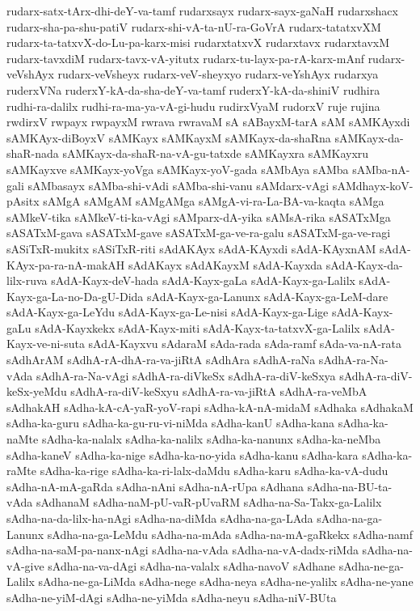 {rudarx-satx-tArx-dhi-deY-va-tamf
rudarxsayx
rudarx-sayx-gaNaH
rudarxshacx
rudarx-sha-pa-shu-patiV
rudarx-shi-vA-ta-nU-ra-GoVrA
rudarx-tatatxvXM
rudarx-ta-tatxvX-do-Lu-pa-karx-misi
rudarxtatxvX
rudarxtavx
rudarxtavxM
rudarx-tavxdiM
rudarx-tavx-vA-yitutx
rudarx-tu-layx-pa-rA-karx-mAnf
rudarx-veVshAyx
rudarx-veVsheyx
rudarx-veV-sheyxyo
rudarx-veYshAyx
rudarxya
ruderxVNa
ruderxY-kA-da-sha-deY-va-tamf
ruderxY-kA-da-shiniV
rudhira
rudhi-ra-dalilx
rudhi-ra-ma-ya-vA-gi-hudu
rudirxVyaM
rudorxV
ruje
rujina
rwdirxV
rwpayx
rwpayxM
rwrava
rwravaM
sA
sABayxM-tarA
sAM
sAMKAyxdi
sAMKAyx-diBoyxV
sAMKayx
sAMKayxM
sAMKayx-da-shaRna
sAMKayx-da-shaR-nada
sAMKayx-da-shaR-na-vA-gu-tatxde
sAMKayxra
sAMKayxru
sAMKayxve
sAMKayx-yoVga
sAMKayx-yoV-gada
sAMbAya
sAMba
sAMba-nA-gali
sAMbasayx
sAMba-shi-vAdi
sAMba-shi-vanu
sAMdarx-vAgi
sAMdhayx-koV-pAsitx
sAMgA
sAMgAM
sAMgAMga
sAMgA-vi-ra-La-BA-va-kaqta
sAMga
sAMkeV-tika
sAMkeV-ti-ka-vAgi
sAMparx-dA-yika
sAMsA-rika
sASATxMga
sASATxM-gava
sASATxM-gave
sASATxM-ga-ve-ra-galu
sASATxM-ga-ve-ragi
sASiTxR-mukitx
sASiTxR-riti
sAdAKAyx
sAdA-KAyxdi
sAdA-KAyxnAM
sAdA-KAyx-pa-ra-nA-makAH
sAdAKayx
sAdAKayxM
sAdA-Kayxda
sAdA-Kayx-da-lilx-ruva
sAdA-Kayx-deV-hada
sAdA-Kayx-gaLa
sAdA-Kayx-ga-Lalilx
sAdA-Kayx-ga-La-no-Da-gU-Dida
sAdA-Kayx-ga-Lanunx
sAdA-Kayx-ga-LeM-dare
sAdA-Kayx-ga-LeYdu
sAdA-Kayx-ga-Le-nisi
sAdA-Kayx-ga-Lige
sAdA-Kayx-gaLu
sAdA-Kayxkekx
sAdA-Kayx-miti
sAdA-Kayx-ta-tatxvX-ga-Lalilx
sAdA-Kayx-ve-ni-suta
sAdA-Kayxvu
sAdaraM
sAda-rada
sAda-ramf
sAda-va-nA-rata
sAdhArAM
sAdhA-rA-dhA-ra-va-jiRtA
sAdhAra
sAdhA-raNa
sAdhA-ra-Na-vAda
sAdhA-ra-Na-vAgi
sAdhA-ra-diVkeSx
sAdhA-ra-diV-keSxya
sAdhA-ra-diV-keSx-yeMdu
sAdhA-ra-diV-keSxyu
sAdhA-ra-va-jiRtA
sAdhA-ra-veMbA
sAdhakAH
sAdha-kA-cA-yaR-yoV-rapi
sAdha-kA-nA-midaM
sAdhaka
sAdhakaM
sAdha-ka-guru
sAdha-ka-gu-ru-vi-niMda
sAdha-kanU
sAdha-kana
sAdha-ka-naMte
sAdha-ka-nalalx
sAdha-ka-nalilx
sAdha-ka-nanunx
sAdha-ka-neMba
sAdha-kaneV
sAdha-ka-nige
sAdha-ka-no-yida
sAdha-kanu
sAdha-kara
sAdha-ka-raMte
sAdha-ka-rige
sAdha-ka-ri-lalx-daMdu
sAdha-karu
sAdha-ka-vA-dudu
sAdha-nA-mA-gaRda
sAdha-nAni
sAdha-nA-rUpa
sAdhana
sAdha-na-BU-ta-vAda
sAdhanaM
sAdha-naM-pU-vaR-pUvaRM
sAdha-na-Sa-Takx-ga-Lalilx
sAdha-na-da-lilx-ha-nAgi
sAdha-na-diMda
sAdha-na-ga-LAda
sAdha-na-ga-Lanunx
sAdha-na-ga-LeMdu
sAdha-na-mAda
sAdha-na-mA-gaRkekx
sAdha-namf
sAdha-na-saM-pa-nanx-nAgi
sAdha-na-vAda
sAdha-na-vA-dadx-riMda
sAdha-na-vA-give
sAdha-na-va-dAgi
sAdha-na-valalx
sAdha-navoV
sAdhane
sAdha-ne-ga-Lalilx
sAdha-ne-ga-LiMda
sAdha-nege
sAdha-neya
sAdha-ne-yalilx
sAdha-ne-yane
sAdha-ne-yiM-dAgi
sAdha-ne-yiMda
sAdha-neyu
sAdha-niV-BUta
}
